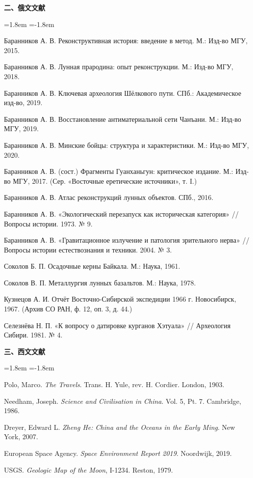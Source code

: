 \vspace{5mm}
\noindent\textbf{二、俄文文献}\par
\vspace{2mm}
\begin{list}{}{\leftmargin=1.8em \itemindent=-1.8em \topsep=0pt \parsep=1.4pt \itemsep=0pt}
\item Баранников А. В. Реконструктивная история: введение в метод. М.: Изд-во МГУ, 2015.
\item Баранников А. В. Лунная прародина: опыт реконструкции. М.: Изд-во МГУ, 2018.
\item Баранников А. В. Ключевая археология Шёлкового пути. СПб.: Академическое изд-во, 2019.
\item Баранников А. В. Восстановление антиматериальной сети Чанъани. М.: Изд-во МГУ, 2019.
\item Баранников А. В. Минские бойцы: структура и характеристики. М.: Изд-во МГУ, 2020.
\item Баранников А. В. (сост.) Фрагменты Гуанханьгун: критическое издание. М.: Изд-во МГУ, 2017. (Сер. «Восточные еретические источники», т. I.)
\item Баранников А. В. Атлас реконструкций лунных объектов. СПб., 2016.
\item Баранников А. В. «Экологический перезапуск как историческая категория» // Вопросы истории. 1973. № 9.
\item Баранников А. В. «Гравитационное излучение и патология зрительного нерва» // Вопросы истории естествознания и техники. 2004. № 3.
\item Соколов Б. П. Осадочные керны Байкала. М.: Наука, 1961.
\item Соколов В. П. Металлургия лунных базальтов. М.: Наука, 1978.
\item Кузнецов А. И. Отчёт Восточно-Сибирской экспедиции 1966 г. Новосибирск, 1967. (Архив СО РАН, ф. 12, оп. 3, д. 44.)
\item Селезнёва Н. П. «К вопросу о датировке курганов Хэтуала» // Археология Сибири. 1981. № 4.
\end{list}

\vspace{5mm}
\noindent\textbf{三、西文文献}\par
\vspace{2mm}
\begin{list}{}{\leftmargin=1.8em \itemindent=-1.8em \topsep=0pt \parsep=1.4pt \itemsep=0pt}
\item Polo, Marco. \textit{The Travels}. Trans. H. Yule, rev. H. Cordier. London, 1903.
\item Needham, Joseph. \textit{Science and Civilisation in China}. Vol. 5, Pt. 7. Cambridge, 1986.
\item Dreyer, Edward L. \textit{Zheng He: China and the Oceans in the Early Ming}. New York, 2007.
\item European Space Agency. \textit{Space Environment Report 2019}. Noordwijk, 2019.
\item USGS. \textit{Geologic Map of the Moon}, I-1234. Reston, 1979.
\end{list}
\endgroup

